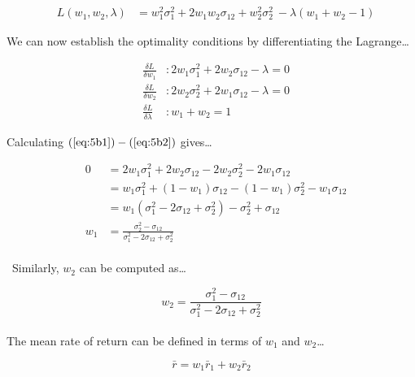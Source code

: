 \documentclass[11pt]{article}
\begin{document}
\begin{eqnarray}
  & L(w_{1},w_{2},\lambda) &= w_{1}^{2}\sigma^{2}_{1} + 2w_{1}w_{2}\sigma_{12} + w_{2}^{2}\sigma^{2}_{2} \
  - \lambda\left(w_{1} + w_{2} - 1\right)
\end{eqnarray}

We can now establish the optimality conditions by differentiating the Lagrange\dots

\begin{eqnarray}
  & \frac{\delta L}{\delta w_{1}} &: 2w_{1}\sigma^{2}_{1} + 2w_{2}\sigma_{12} - \lambda = 0 \label{eq:5b1}\\
  & \frac{\delta L}{\delta w_{2}} &: 2w_{2}\sigma^{2}_{2} + 2w_{1}\sigma_{12} - \lambda = 0 \label{eq:5b2}\\
  & \frac{\delta L}{\delta \lambda} &: w_{1} + w_{2} = 1
\end{eqnarray}

Calculating $\left(\ref{eq:5b1}\right) - \left(\ref{eq:5b2}\right)$ gives\dots

\begin{eqnarray}
  & 0 &= 2w_{1}\sigma^{2}_{1} + 2w_{2}\sigma_{12} - 2w_{2}\sigma^{2}_{2} - 2w_{1}\sigma_{12} \\
  &&= w_{1}\sigma^{2}_{1} + \left(1-w_{1}\right)\sigma_{12} - \left(1-w_{1}\right)\sigma_{2}^{2} - w_{1}\sigma_{12} \\
  &&= w_{1}\left(\sigma^{2}_{1} - 2\sigma_{12} + \sigma^{2}_{2}\right) - \sigma^{2}_{2} + \sigma_{12} \\
  & w_{1} &= \frac{\sigma^{2}_{2} - \sigma_{12}}{\sigma^{2}_{1} - 2\sigma_{12} + \sigma^{2}_{2}}
\end{eqnarray}\\[1mm]
\
Similarly, $w_{2}$ can be computed as\dots

\[ w_{2} = \frac{\sigma^{2}_{1} - \sigma_{12}}{\sigma^{2}_{1} - 2\sigma_{12} + \sigma^{2}_{2}} \] \\

The mean rate of return can be defined in terms of $w_{1}$ and $w_{2}$\dots

\[ \bar{r} = w_{1}\bar{r}_{1} + w_{2}\bar{r}_{2} \]
\end{document}

